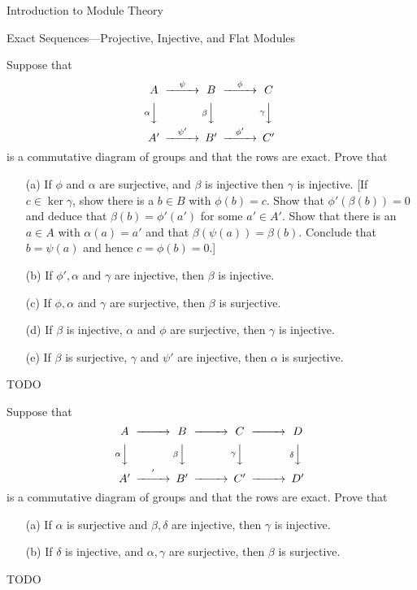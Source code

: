 \begin{chapter}{Introduction to Module Theory}
\begin{section}{Exact Sequences---Projective, Injective, and Flat Modules}
\begin{problem}\label{ex:10.5.1}
Suppose that \[\begin{CD}
A @>\psi>> B @>\phi>>C\\
@V\alpha VV @V\beta VV @V\gamma VV\\
A' @>\psi'>> B' @>\phi'>>C'
\end{CD}\]
is a commutative diagram of groups and that the rows are exact. Prove that \begin{enumerate}
\item[(a)] If $\phi$ and $\alpha$ are surjective, and $\beta$ is injective then $\gamma$ is injective. [If $c\in\ker \gamma$, show there is a $b\in B$ with $\phi(b)=c.$ Show that $\phi'(\beta(b)) = 0$ and deduce that $\beta(b)=\phi'(a')$ for some $a'\in A'$. Show that there is an $a\in A$ with $\alpha(a) = a'$ and that $\beta(\psi(a)) = \beta(b).$ Conclude that $b=\psi(a)$ and hence $c=\phi(b) = 0$.]
\item[(b)] If $\phi',\alpha$ and $\gamma$ are injective, then $\beta$ is injective.
\item[(c)] If $\phi,\alpha$ and $\gamma$ are surjective, then $\beta$ is surjective.
\item[(d)] If $\beta$ is injective, $\alpha$ and $\phi$ are surjective, then $\gamma$ is injective.
\item[(e)] If $\beta$ is surjective, $\gamma$ and $\psi'$ are injective, then $\alpha$ is surjective.
\end{enumerate}
\end{problem}
\begin{solution}TODO

\end{solution}\oneperpage



\begin{problem}\label{ex:10.5.2}
Suppose that \[\begin{CD}
A @>>> B @>>>C@>>>D\\
@V\alpha VV @V\beta VV @V\gamma VV@V\delta  VV\\
A' @>'>> B' @>>>C'@>>>D'
\end{CD}\]
is a commutative diagram of groups and that the rows are exact. Prove that \begin{enumerate}
\item[(a)] If $\alpha$ is surjective and $\beta,\delta$ are injective, then $\gamma$ is injective.
\item[(b)] If $\delta$ is injective, and $\alpha,\gamma$ are surjective, then $\beta$ is surjective.
\end{enumerate}
\end{problem}
\begin{solution}TODO


\end{solution}
\end{section}
\end{chapter}
